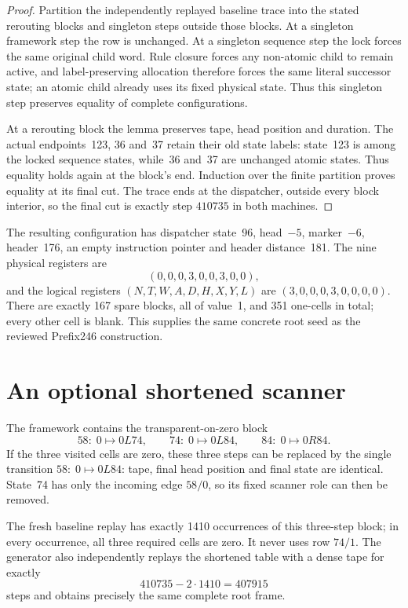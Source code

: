 \documentclass[11pt]{article}
\begin{document}
\begin{proof}
Partition the independently replayed baseline trace into the stated
rerouting blocks and singleton steps outside those blocks. At a singleton
framework step the row is unchanged. At a singleton sequence step the lock
forces the same original child word. Rule closure forces any non-atomic
child to remain active, and label-preserving allocation therefore forces
the same literal successor state; an atomic child already uses its fixed
physical state. Thus this singleton step preserves equality of complete
configurations.

At a rerouting block the lemma preserves tape, head position and duration.
The actual endpoints~123, 36 and~37 retain their old state labels: state~123
is among the locked sequence states, while~36 and~37 are unchanged atomic
states. Thus equality holds again at the block's end. Induction over the
finite partition proves equality at its final cut. The trace ends at the
dispatcher, outside every block interior, so the final cut is exactly step
$410735$ in both machines.
\end{proof}

The resulting configuration has dispatcher state~96, head~$-5$, marker~$-6$,
header~176, an empty instruction pointer and header distance~181. The nine
physical registers are
\[
 (0,0,0,3,0,0,3,0,0),
\]
and the logical registers $(N,T,W,A,D,H,X,Y,L)$ are
$(3,0,0,0,3,0,0,0,0)$. There are exactly 167 spare blocks, all of value~1,
and 351 one-cells in total; every other cell is blank. This supplies the
same concrete root seed as the reviewed Prefix246 construction.

\section{An optional shortened scanner}

The framework contains the transparent-on-zero block
\[
 58:\;0\mapsto0L74,\qquad
 74:\;0\mapsto0L84,\qquad
 84:\;0\mapsto0R84.
\]
If the three visited cells are zero, these three steps can be replaced by
the single transition $58:\;0\mapsto0L84$: tape, final head position and
final state are identical. State~74 has only the incoming edge $58/0$, so
its fixed scanner role can then be removed.

The fresh baseline replay has exactly 1410 occurrences of this three-step
block; in every occurrence, all three required cells are zero. It never
uses row $74/1$. The generator also independently replays the shortened
table with a dense tape for exactly
\[
 410735-2\cdot1410=407915
\]
steps and obtains precisely the same complete root frame.
\end{document}
